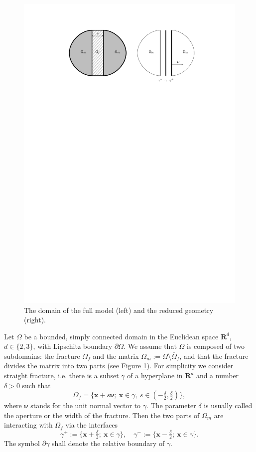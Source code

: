 \documentclass[a4paper]{article}
\def\nnu{\vc\nu}
\def\prtl{\partial}
\def\Real{{\mathbf R}}
\def\vc#1{\mathbf{\boldsymbol{#1}}}     %
\def\xx{\vc x}
\newcommand{\eq}[1]{\begin{equation}#1\end{equation}}
\newcommand{\eqs}[1]{\begin{equation*}#1\end{equation*}}
\begin{document}
\begin{figure}[h]
\centering
\includegraphics[width=\textwidth]{figures/omegas}
\caption{The domain of the full model (left) and the reduced geometry (right).}
\label{fig:omegas}
\end{figure}

Let $\Omega$ be a bounded, simply connected domain in the Euclidean space $\Real^d$, $d\in\{2,3\}$, with Lipschitz boundary $\partial\Omega$.
We assume that $\Omega$ is composed of two subdomains: the fracture $\Omega_f$ and the matrix $\Omega_m:=\Omega\setminus\overline\Omega_f$, and that the fracture divides the matrix into two parts (see Figure \ref{fig:omegas}).
For simplicity we consider straight fracture, i.e. there is a subset $\gamma$ of a hyperplane in $\Real^d$ and a number $\delta>0$ such that
\eqs{ \Omega_f = \{\xx+s\nnu;~\xx\in\gamma,~s\in(-\tfrac\delta2,\tfrac\delta2)\}, }
where $\nnu$ stands for the unit normal vector to $\gamma$.
The parameter $\delta$ is usually called the aperture or the width of the fracture.
Then the two parts of $\Omega_m$ are interacting with $\Omega_f$ via the interfaces
\eqs{ \gamma^+ := \{\xx+\tfrac\delta2;~\xx\in\gamma\},\quad \gamma^- := \{\xx-\tfrac\delta2;~\xx\in\gamma\}. }
The symbol $\prtl\gamma$ shall denote the relative boundary of $\gamma$.
\end{document}

